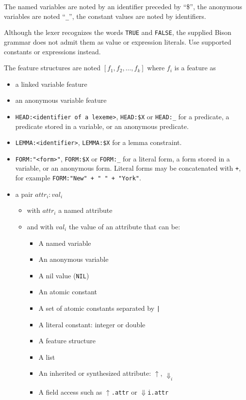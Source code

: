 \documentclass[11pt]{article}
\begin{document}
The named variables are noted by an identifier preceded by ``\$'',
the anonymous variables are noted ``\verb#_#'', the
constant values are noted by identifiers.

Although the lexer recognizes the words \verb#TRUE# and \verb#FALSE#,
the supplied Bison grammar does not admit them as value or expression
literals. Use supported constants or expressions instead.

The feature structures are noted $[ f_1, f_2, \dots, f_k ]$
where $ f_i$ is a feature as
\begin{itemize}
	\item a linked variable feature
	\item an anonymous variable feature
	\item \verb#HEAD:<identifier of a lexeme>#, \verb#HEAD:$X# or
	      \verb#HEAD:_# for a predicate, a predicate stored in a variable, or
	      an anonymous predicate.
	\item \verb#LEMMA:<identifier>#, \verb#LEMMA:$X# for a lemma constraint.
	\item \verb#FORM:"<form>"#, \verb#FORM:$X# or \verb#FORM:_# for a literal
	      form, a form stored in a variable, or an anonymous form.  Literal
	      forms may be concatenated with \verb#+#, for example
	      \verb#FORM:"New" + " " + "York"#.
	\item a pair $attr_i:val_i$
	      \begin{itemize}
		      \item with $attr_i$ a named attribute
		      \item and with $val_i$ the value of an attribute that can be:

		            \begin{itemize}
		            \item A named variable
		            \item An anonymous variable
		            \item A nil value (\texttt{NIL})
		            \item An atomic constant
		            \item A set of atomic constants separated by \verb#|#
		            \item A literal constant: integer or double
		            \item A feature structure
		            \item A list
		            \item An inherited or synthesized attribute: $\uparrow$,
		                  $\Downarrow_i$
		            \item A field access such as $\uparrow$\verb#.attr# or
		                  $\Downarrow$\verb#i.attr#
		            \end{itemize}
	      \end{itemize}

\end{itemize}
\end{document}

